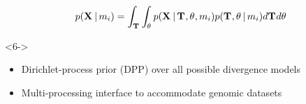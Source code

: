 \begin{frame}[t]
\begin{minipage}[t][0.35\textheight][t]{\linewidth}
\begin{uncoverenv}
\begin{displaybox}[0.85\linewidth]
\begin{minipage}[c][0.1\textheight][c]{\linewidth}
\begin{onlyenv}
                        \[
                            p(\alignmentVector \given \divModel{i}) =
                            \int_{\divTimeMapVector} \int_{\allParameters{}}
                            p(\alignmentVector \given \divTimeMapVector, \allParameters{}, \divModel{i})
                            p(\divTimeMapVector, \allParameters{} \given \divModel{i})
                            d\divTimeMapVector d\allParameters{}
                        \]
                    \end{onlyenv}
                \end{minipage}
            \end{displaybox}
        \end{uncoverenv}

        \vspace{-1mm}

        \begin{uncoverenv}<6->
            \begin{center}
                \begin{itemize}
                    \small
                    \item Dirichlet-process prior (DPP) over all possible divergence
                        models
                    \item Multi-processing interface to accommodate genomic datasets
                \end{itemize}
            \end{center}
        \end{uncoverenv}
    \end{minipage}
\end{frame}

